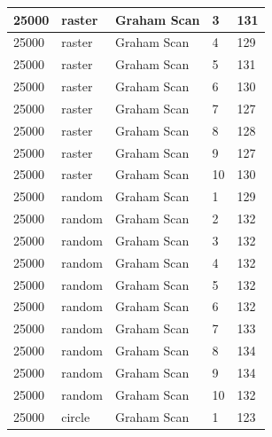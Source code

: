 \documentclass[12pt]{article}
\begin{document}
\begin{longtable}{|l|l|l|l|l|}
25000        & raster            & Graham Scan & 3          & 131                           \\ \hline
25000        & raster            & Graham Scan & 4          & 129                           \\ \hline
25000        & raster            & Graham Scan & 5          & 131                           \\ \hline
25000        & raster            & Graham Scan & 6          & 130                           \\ \hline
25000        & raster            & Graham Scan & 7          & 127                           \\ \hline
25000        & raster            & Graham Scan & 8          & 128                           \\ \hline
25000        & raster            & Graham Scan & 9          & 127                           \\ \hline
25000        & raster            & Graham Scan & 10         & 130                           \\ \hline
25000        & random            & Graham Scan & 1          & 129                           \\ \hline
25000        & random            & Graham Scan & 2          & 132                           \\ \hline
25000        & random            & Graham Scan & 3          & 132                           \\ \hline
25000        & random            & Graham Scan & 4          & 132                           \\ \hline
25000        & random            & Graham Scan & 5          & 132                           \\ \hline
25000        & random            & Graham Scan & 6          & 132                           \\ \hline
25000        & random            & Graham Scan & 7          & 133                           \\ \hline
25000        & random            & Graham Scan & 8          & 134                           \\ \hline
25000        & random            & Graham Scan & 9          & 134                           \\ \hline
25000        & random            & Graham Scan & 10         & 132                           \\ \hline
25000        & circle            & Graham Scan & 1          & 123                           \\ \hline

\end{longtable}
\end{document}
